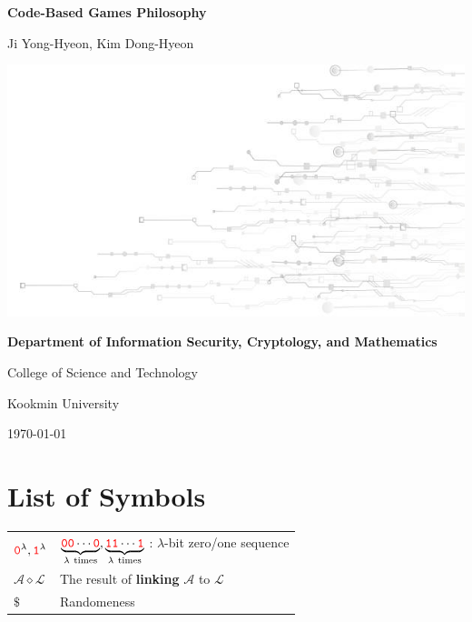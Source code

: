 \documentclass[12pt,openany]{book}
\theoremstyle{definition}
\newcommand{\library}{\mathcal{L}}
\newcommand{\zero}{\textcolor{red}{\texttt{0}}}
\newcommand{\one}{\textcolor{red}{\texttt{1}}}
\newcommand{\adversary}{\mathcal{A}}
\newcommand{\linking}{\diamond}
\newcommand{\randomness}{\$}
\begin{document}
	
	\begin{titlepage}
		\begin{center}
			{\Huge\textsf{\textbf{Code-Based Games Philosophy}}\par}
			\vspace{0.5in}
			{\Large Ji Yong-Hyeon, Kim Dong-Hyeon\par}
			\vspace{1in}
			\includegraphics[scale=2.5]{urop.jpg}\par
			\vspace{1in}
			{\bf Department of Information Security, Cryptology, and Mathematics\par}
			{College of Science and Technology\par}
			{Kookmin University\par}
			\vspace{.25in}
			{\large \today\par}
		\end{center}
	\end{titlepage}
	
	\tableofcontents
	
	\mainmatter
	
	\chapter*{List of Symbols}
	
	\begin{tabular}{ll}
		\( \zero^\lambda, \one^\lambda\) & \(\underbrace{\zero\zero\cdots\zero}_{\lambda\ \text{times}}, \underbrace{\one\one\cdots\one}_{\lambda\ \text{times}}\) : \(\lambda\)-bit zero/one sequence \\
		\( \adversary\linking\library \) & The result of \textbf{linking} $\adversary$ to  $\library$ \\
		\( \randomness \) & Randomeness \\
	\end{tabular}
	
\end{document}
